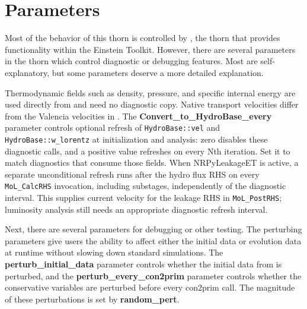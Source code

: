 \documentclass{article}
\begin{document}
\section{Parameters}

Most of the behavior of this thorn is controlled by \glib,
the thorn that provides \grhayl{} functionality
within the Einstein Toolkit. However, there are several
parameters in the thorn which control diagnostic or debugging
features. Most are self-explanatory, but some parameters deserve
a more detailed explanation.

Thermodynamic fields such as density, pressure, and specific internal energy
are used directly from \hydrobase{} and need no diagnostic copy. Native
transport velocities differ from the Valencia velocities in \hydrobase{}.
The \textbf{Convert\_to\_HydroBase\_every} parameter controls optional refresh
of \texttt{HydroBase::vel} and \texttt{HydroBase::w\_lorentz} at initialization
and analysis: zero disables these diagnostic calls, and a positive value
refreshes on every Nth iteration. Set it to match diagnostics that consume
those fields. When NRPyLeakageET is active, a separate unconditional refresh
runs after the hydro flux RHS on every \texttt{MoL\_CalcRHS} invocation,
including substages, independently of the diagnostic interval. This supplies
current velocity for the leakage RHS in \texttt{MoL\_PostRHS}; luminosity
analysis still needs an appropriate diagnostic refresh interval.

Next, there are several parameters for debugging or other testing.
The perturbing parameters give users the ability to affect either
the initial data or evolution data at runtime without slowing down
standard simulations. The \textbf{perturb\_initial\_data} parameter
controls whether the initial data from \hydrobase{} is perturbed, and
the \textbf{perturb\_every\_con2prim} parameter controls whether
the conservative variables are perturbed before every con2prim call.
The magnitude of these perturbations is set by \textbf{random\_pert}.

\end{document}
